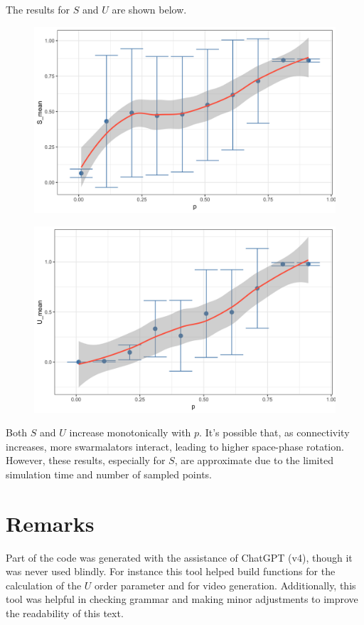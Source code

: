 The results for $S$ and $U$ are shown below.

\begin{figure}[h]
    \centering
    \begin{minipage}[c]{0.8\textwidth}
        \includegraphics[width=\textwidth]{images/task1-appendix/S_K=-0.6,J=0.9.png}
    \end{minipage}
    \label{fig:S}
\end{figure}

\begin{figure}[h]
    \centering
    \begin{minipage}[c]{0.8\textwidth}
        \includegraphics[width=\textwidth]{images/task1-appendix/U_K=-0.6,J=0.9.png}
    \end{minipage}
    \label{fig:U}
\end{figure}

Both $S$ and $U$ increase monotonically with $p$. 
It's possible that, as connectivity increases, more swarmalators interact, leading to higher space-phase rotation.
However, these results, especially for $S$, are approximate due to the limited simulation time and number of sampled points.

\chapter*{Remarks}
Part of the code was generated with the assistance of ChatGPT (v4), though it was never used blindly. For instance this tool helped build functions for the calculation of the \( U \) order parameter and for video generation. Additionally, this tool was helpful in checking grammar and making minor adjustments to improve the readability of this text.
